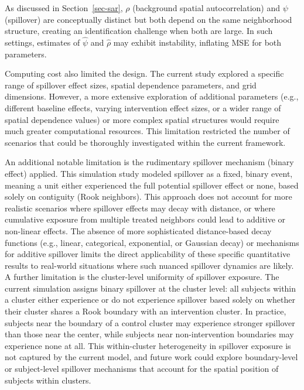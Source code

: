 \documentclass[
  12pt,
  prelim]{bios-prelim}
\newcounter{none} %
\begin{document}
As discussed in Section~\ref{sec-sar}, \(\rho\) (background spatial
autocorrelation) and \(\psi\) (spillover) are conceptually distinct but
both depend on the same neighborhood structure, creating an
identification challenge when both are large. In such settings,
estimates of \(\hat{\psi}\) and \(\hat{\rho}\) may exhibit instability,
inflating MSE for both parameters.

Computing cost also limited the design. The current study explored a
specific range of spillover effect sizes, spatial dependence parameters,
and grid dimensions. However, a more extensive exploration of additional
parameters (e.g., different baseline effects, varying intervention
effect sizes, or a wider range of spatial dependence values) or more
complex spatial structures would require much greater computational
resources. This limitation restricted the number of scenarios that could
be thoroughly investigated within the current framework.

An additional notable limitation is the rudimentary spillover mechanism
(binary effect) applied. This simulation study modeled spillover as a
fixed, binary event, meaning a unit either experienced the full
potential spillover effect or none, based solely on contiguity (Rook
neighbors). This approach does not account for more realistic scenarios
where spillover effects may decay with distance, or where cumulative
exposure from multiple treated neighbors could lead to additive or
non-linear effects. The absence of more sophisticated distance-based
decay functions (e.g., linear, categorical, exponential, or Gaussian
decay) or mechanisms for additive spillover limits the direct
applicability of these specific quantitative results to real-world
situations where such nuanced spillover dynamics are likely. A further
limitation is the cluster-level uniformity of spillover exposure. The
current simulation assigns binary spillover at the cluster level: all
subjects within a cluster either experience or do not experience
spillover based solely on whether their cluster shares a Rook boundary
with an intervention cluster. In practice, subjects near the boundary of
a control cluster may experience stronger spillover than those near the
center, while subjects near non-intervention boundaries may experience
none at all. This within-cluster heterogeneity in spillover exposure is
not captured by the current model, and future work could explore
boundary-level or subject-level spillover mechanisms that account for
the spatial position of subjects within clusters.
\end{document}

